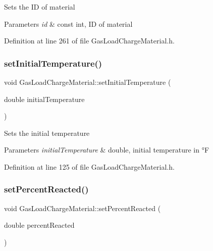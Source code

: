 Sets the ID of material 
\begin{DoxyParams}{Parameters}
{\em id} & const int, ID of material \\
\hline
\end{DoxyParams}


Definition at line 261 of file Gas\+Load\+Charge\+Material.\+h.

\mbox{\label{class_gas_load_charge_material_aec9ddfce5e31099b6a047e3d98d80d47}} 
\subsubsection{\texorpdfstring{set\+Initial\+Temperature()}{setInitialTemperature()}}
{\footnotesize\ttfamily void Gas\+Load\+Charge\+Material\+::set\+Initial\+Temperature (\begin{DoxyParamCaption}\item[{double}]{initial\+Temperature }\end{DoxyParamCaption})\hspace{0.3cm}{\ttfamily [inline]}}

Sets the initial temperature 
\begin{DoxyParams}{Parameters}
{\em initial\+Temperature} & double, initial temperature in °F \\
\hline
\end{DoxyParams}


Definition at line 125 of file Gas\+Load\+Charge\+Material.\+h.

\mbox{\label{class_gas_load_charge_material_a7142cb6bbfba53d640dd6f1590fe32f6}} 
\subsubsection{\texorpdfstring{set\+Percent\+Reacted()}{setPercentReacted()}}
{\footnotesize\ttfamily void Gas\+Load\+Charge\+Material\+::set\+Percent\+Reacted (\begin{DoxyParamCaption}\item[{double}]{percent\+Reacted }\end{DoxyParamCaption})\hspace{0.3cm}{\ttfamily [inline]}}

